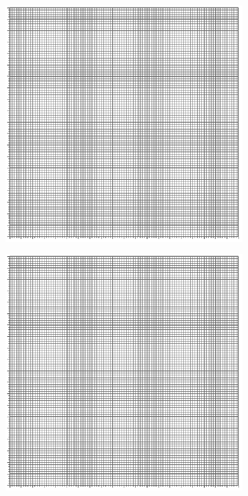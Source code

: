 \documentclass[UTF8]{article}
\begin{document}
\begin{figure}[H]\centering
\begin{subfigure}[b]{0.5\columnwidth}\centering
    \includegraphics[width=\columnwidth]{assets/100x100.pdf}
\end{subfigure}\hfill
\begin{subfigure}[b]{0.5\columnwidth}\centering
    \includegraphics[width=\columnwidth]{assets/100x100.pdf}
\end{subfigure}
\end{figure}
\end{document}
